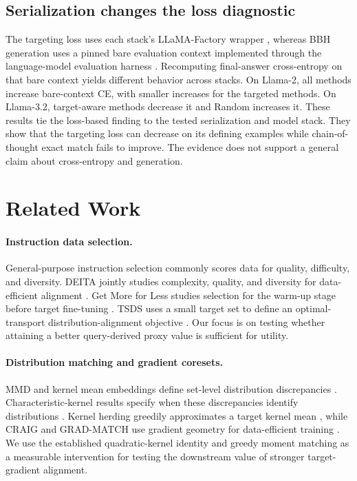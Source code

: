 \documentclass{article}
\begin{document}
\subsection{Serialization changes the loss diagnostic}

The targeting loss uses each stack's LLaMA-Factory wrapper
\citep{zheng2024llamafactory}, whereas BBH generation uses a pinned bare
evaluation context implemented through the language-model evaluation harness
\citep{biderman2024evaluation}. Recomputing final-answer
cross-entropy on that bare context yields different behavior across stacks. On
Llama-2, all methods increase bare-context CE, with smaller increases for the
targeted methods. On Llama-3.2, target-aware methods decrease it and Random
increases it. These results tie the loss-based finding to the tested
serialization and model stack. They show that the targeting loss can decrease
on its defining examples while chain-of-thought exact match fails to improve.
The evidence does not support a general claim about cross-entropy and
generation.

\section{Related Work}
\label{sec:related}

\paragraph{Instruction data selection.}
General-purpose instruction selection commonly scores data for quality,
difficulty, and diversity. DEITA jointly studies complexity, quality, and
diversity for data-efficient alignment \citep{liu2024deita}. Get More for Less
studies selection for the warm-up stage before target fine-tuning
\citep{kang2024getmore}. TSDS uses a small target set to define an
optimal-transport distribution-alignment objective
\citep{liu2024tsds}. Our focus is on testing whether attaining a better
query-derived proxy value is sufficient for utility.

\paragraph{Distribution matching and gradient coresets.}
MMD and kernel mean embeddings define set-level distribution discrepancies
\citep{gretton2012mmd,muandet2017kme}. Characteristic-kernel results specify
when these discrepancies identify distributions
\citep{sriperumbudur2011universality}. Kernel herding greedily approximates a
target kernel mean \citep{chen2010herding,bach2012herding}, while CRAIG and
GRAD-MATCH use gradient geometry for data-efficient training
\citep{mirzasoleiman2020craig,killamsetty2021gradmatch}. We use the established
quadratic-kernel identity and greedy moment matching as a measurable
intervention for testing the downstream value of stronger target-gradient
alignment.
\end{document}
